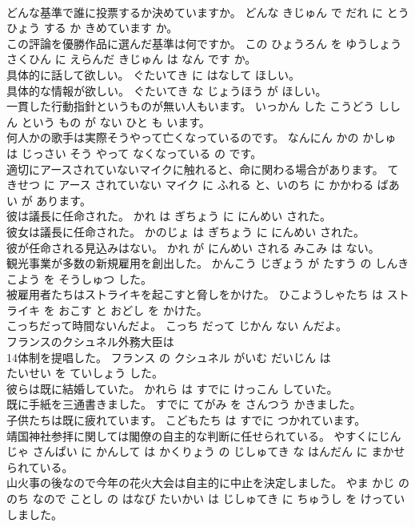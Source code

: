 \documentclass[8pt]{extreport}
\begin{document}
\begin{CJK}{UTF8}{min}
\\	どんな基準で誰に投票するか決めていますか。	どんな きじゅん で だれ に とうひょう する か きめています か。	
\\	この評論を優勝作品に選んだ基準は何ですか。	この ひょうろん を ゆうしょう さくひん に えらんだ きじゅん は なん です か。	
\\	具体的に話して欲しい。	ぐたいてき に はなして ほしい。	
\\	具体的な情報が欲しい。	ぐたいてき な じょうほう が ほしい。	
\\	一貫した行動指針というものが無い人もいます。	いっかん した こうどう ししん という もの が ない ひと も います。	
\\	何人かの歌手は実際そうやって亡くなっているのです。	なんにん かの かしゅ は じっさい そう やって なくなっている の です。	
\\	適切にアースされていないマイクに触れると、命に関わる場合があります。	てきせつ に アース されていない マイク に ふれる と、いのち に かかわる ばあい が あります。	
\\	彼は議長に任命された。	かれ は ぎちょう に にんめい された。	
\\	彼女は議長に任命された。	かのじょ は ぎちょう に にんめい された。	
\\	彼が任命される見込みはない。	かれ が にんめい される みこみ は ない。	
\\	観光事業が多数の新規雇用を創出した。	かんこう じぎょう が たすう の しんき こよう を そうしゅつ した。	
\\	被雇用者たちはストライキを起こすと脅しをかけた。	ひこようしゃたち は ストライキ を おこす と おどし を かけた。	
\\	こっちだって時間ないんだよ。	こっち だって じかん ない んだよ。	
\\	フランスのクシュネル外務大臣は
\\	14体制を提唱した。	フランス の クシュネル がいむ だいじん は 
\\	たいせい を ていしょう した。	
\\	彼らは既に結婚していた。	かれら は すでに けっこん していた。	
\\	既に手紙を三通書きました。	すでに てがみ を さんつう かきました。	
\\	子供たちは既に疲れています。	こどもたち は すでに つかれています。	
\\	靖国神社参拝に関しては閣僚の自主的な判断に任せられている。	やすくにじんじゃ さんぱい に かんして は かくりょう の じしゅてき な はんだん に まかせられている。	
\\	山火事の後なので今年の花火大会は自主的に中止を決定しました。	やま かじ の のち なので ことし の はなび たいかい は じしゅてき に ちゅうし を けってい しました。	

\end{CJK}
\end{document}
